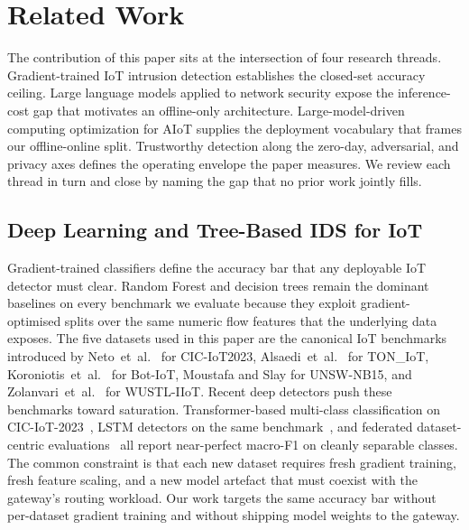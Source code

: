 \section{Related Work}
\label{sec:related}

The contribution of this paper sits at the intersection of four research
threads. Gradient-trained IoT intrusion detection establishes the
closed-set accuracy ceiling. Large language models applied to network
security expose the inference-cost gap that motivates an offline-only
architecture. Large-model-driven computing optimization for AIoT supplies
the deployment vocabulary that frames our offline-online split.
Trustworthy detection along the zero-day, adversarial, and privacy axes
defines the operating envelope the paper measures. We review each thread
in turn and close by naming the gap that no prior work jointly fills.

\subsection{Deep Learning and Tree-Based IDS for IoT}
\label{subsec:rw_dl_ids}

Gradient-trained classifiers define the accuracy bar that any
deployable IoT detector must clear. Random Forest and decision trees
remain the dominant baselines on every benchmark we evaluate because they
exploit gradient-optimised splits over the same numeric flow features
that the underlying data exposes. The five datasets used in this paper
are the canonical IoT benchmarks introduced by Neto~et~al.\
\cite{neto2023ciciot2023} for CIC-IoT2023, Alsaedi~et~al.\
\cite{alsaedi2020toniot} for TON\_IoT, Koroniotis~et~al.\
\cite{koroniotis2019botiot} for Bot-IoT, Moustafa and Slay
\cite{moustafa2015unswnb15} for UNSW-NB15, and Zolanvari~et~al.\
\cite{zolanvari2019wustl,zolanvari2021wustl} for WUSTL-IIoT. Recent deep
detectors push these benchmarks toward saturation. Transformer-based
multi-class classification on CIC-IoT-2023~\cite{wang2024transformer},
LSTM detectors on the same
benchmark~\cite{aboulela2025transformer,deeplearning2025lstm}, and
federated dataset-centric evaluations~\cite{federated2025iotids} all
report near-perfect macro-F1 on cleanly separable classes. The common
constraint is that each new dataset requires fresh gradient training,
fresh feature scaling, and a new model artefact that must coexist with
the gateway's routing workload. Our work targets the same accuracy bar
without per-dataset gradient training and without shipping model weights
to the gateway.

